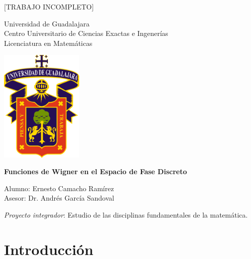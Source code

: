 \documentclass[a4paper]{report}
\begin{document}
  \begin{titlepage}
    \begin{center}
      \huge [TRABAJO INCOMPLETO]

      \vspace{1.0in}

      \huge
      Universidad de Guadalajara\\
      \vspace{0.2cm}
      \large
      Centro Universitario de Ciencias Exactas e Ingenerías\\
      Licenciatura en Matemáticas\\

      \vspace{0.5in}

      \includegraphics[width=0.3\textwidth]{imgs/udg}
      
      \vspace{0.5in}

      \huge
      \textbf{
        Funciones de Wigner en el Espacio de Fase Discreto
      }

      \large
      \vspace{1.0in}
      
      Alumno: Ernesto Camacho Ramírez \\
      \vspace{0.2cm}
      Asesor: Dr. Andrés García Sandoval \\

      \vfill
           
      \textit{Proyecto integrador}: Estudio de las
      disciplinas fundamentales de la matemática.
     \end{center}
  \end{titlepage}

  \tableofcontents

  \newpage
  \section{Introducción}
\end{document}
